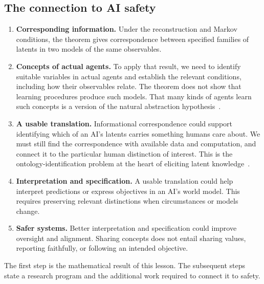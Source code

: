 \documentclass[11pt]{article}
\begin{document}
\subsection{The connection to AI safety}
\label{sec:context-safety}
\begin{enumerate}
\item \textbf{Corresponding information.} Under the reconstruction and Markov
conditions, the theorem gives correspondence between specified families of latents in
two models of the same observables.
\item \textbf{Concepts of actual agents.} To apply that result, we need to
identify suitable variables in actual agents and establish the relevant
conditions, including how their observables relate. The theorem does not show
that learning procedures produce such models. That many kinds of agents
learn such concepts is a version of the natural abstraction
hypothesis~\citep{wentworth2021testing}.
\item \textbf{A usable translation.} Informational correspondence could support
identifying which of an AI's latents carries something humans care about. We
must still find
the correspondence with available data and computation, and connect it to the
particular human distinction of interest. This is the ontology-identification
problem at the heart of eliciting latent knowledge~\citep{christiano2021elk}.
\item \textbf{Interpretation and specification.} A usable translation could help
interpret predictions or express objectives in an AI's world model. This requires
preserving relevant distinctions when circumstances or models change.
\item \textbf{Safer systems.} Better interpretation and specification could improve
oversight and alignment. Sharing concepts does not entail sharing values,
reporting faithfully, or following an intended objective.
\end{enumerate}
The first step is the mathematical result of this lesson. The subsequent steps
state a research program and the additional work required to connect it to
safety.
\end{document}
